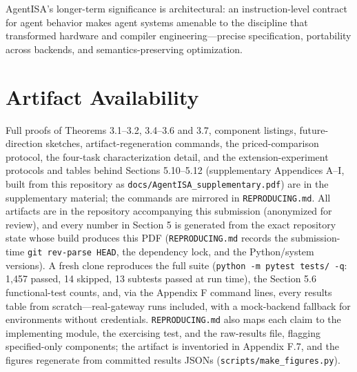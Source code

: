 \documentclass[
  sigconf,
  anonymous]{acmart}
\begin{document}
AgentISA's longer-term significance is architectural: an
instruction-level contract for agent behavior makes agent systems
amenable to the discipline that transformed hardware and compiler
engineering---precise specification, portability across backends, and
semantics-preserving optimization.

\section*{Artifact Availability}\label{artifact-availability}

Full proofs of Theorems 3.1--3.2, 3.4--3.6 and 3.7, component listings,
future-direction sketches, artifact-regeneration commands, the
priced-comparison protocol, the four-task characterization detail, and
the extension-experiment protocols and tables behind Sections 5.10--5.12
(supplementary Appendices A--I, built from this repository as
\texttt{docs/AgentISA\_supplementary.pdf}) are in the supplementary
material; the commands are mirrored in \texttt{REPRODUCING.md}. All
artifacts are in the repository accompanying this submission (anonymized
for review), and every number in Section 5 is generated from the exact
repository state whose build produces this PDF (\texttt{REPRODUCING.md}
records the submission-time \texttt{git\ rev-parse\ HEAD}, the
dependency lock, and the Python/system versions). A fresh clone
reproduces the full suite (\texttt{python\ -m\ pytest\ tests/\ -q}:
1,457 passed, 14 skipped, 13 subtests passed at run time), the Section
5.6 functional-test counts, and, via the Appendix F command lines, every
results table from scratch---real-gateway runs included, with a
mock-backend fallback for environments without credentials.
\texttt{REPRODUCING.md} also maps each claim to the implementing module,
the exercising test, and the raw-results file, flagging specified-only
components; the artifact is inventoried in Appendix F.7, and the figures
regenerate from committed results JSONs
(\texttt{scripts/make\_figures.py}).
\end{document}
